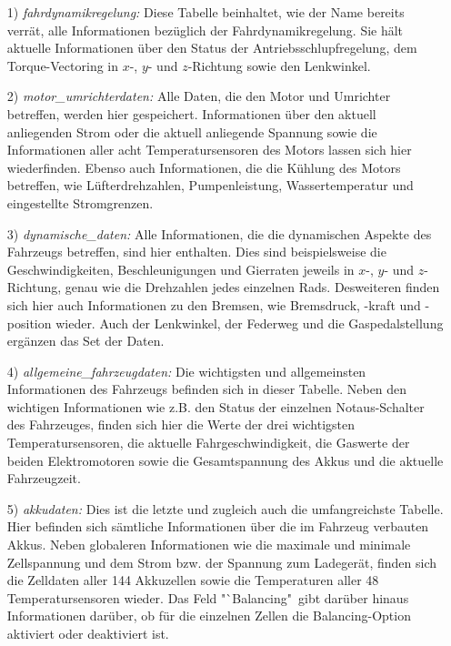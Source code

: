 \documentclass[fontsize = 12pt, paper = a4]{scrreprt}
\begin{document}
\begin{itemize}

\item[1)] \textit{fahrdynamikregelung:} 
Diese Tabelle beinhaltet, wie der Name bereits verrät, alle Informationen bezüglich der Fahrdynamikregelung. Sie hält aktuelle Informationen über den Status der Antriebsschlupfregelung, dem Torque-Vectoring in $x$-, $y$- und $z$-Richtung sowie den Lenkwinkel.

\item[2)] \textit{motor\_umrichterdaten:}
Alle Daten, die den Motor und Umrichter betreffen, werden hier gespeichert. Informationen über den aktuell anliegenden Strom oder die aktuell anliegende Spannung sowie die Informationen aller acht Temperatursensoren des Motors lassen sich hier wiederfinden. Ebenso auch Informationen, die die Kühlung des Motors betreffen, wie Lüfterdrehzahlen, Pumpenleistung, Wassertemperatur und eingestellte Stromgrenzen.

\item[3)] \textit{dynamische\_daten:}
Alle Informationen, die die dynamischen Aspekte des Fahrzeugs betreffen, sind hier enthalten. Dies sind beispielsweise die Geschwindigkeiten, Be\-schleunigungen und Gierraten jeweils in $x$-, $y$- und $z$-Richtung, genau wie die Drehzahlen jedes einzelnen Rads. Desweiteren finden sich hier auch Informationen zu den Bremsen, wie Bremsdruck, -kraft und -position wieder. Auch der Lenkwinkel, der Federweg und die Gaspedalstellung ergänzen das Set der Daten.

\item[4)] \textit{allgemeine\_fahrzeugdaten:} 
Die wichtigsten und allgemeinsten Informationen des Fahrzeugs befinden sich in dieser Tabelle. Neben den wichtigen Informationen wie z.B. den Status der einzelnen Notaus-Schalter des Fahrzeuges, finden sich hier die Werte der drei wichtigsten Temperatursensoren, die aktuelle Fahrgeschwindigkeit, die Gaswerte der beiden Elektromotoren sowie die Gesamtspannung des Akkus und die aktuelle Fahrzeugzeit.

\item[5)] \textit{akkudaten:} Dies ist die letzte und zugleich auch die umfangreichste Tabelle. \\Hier befinden sich sämtliche Informationen über die im Fahrzeug verbauten Akkus. Neben globaleren Informationen wie die maximale und minimale Zellspannung und dem Strom bzw. der Spannung zum Ladegerät, finden sich die Zelldaten aller 144 Akkuzellen sowie die Temperaturen aller 48 Temperatursensoren wieder. Das Feld "`Balancing"\ gibt darüber hinaus Informationen darüber, ob für die einzelnen Zellen die Balancing-Option aktiviert oder deaktiviert ist.

\end{itemize}
\end{document}
